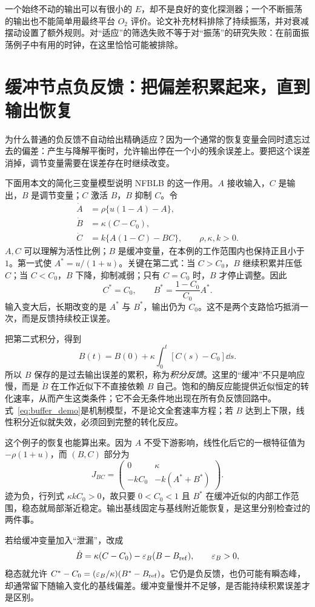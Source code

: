 一个始终不动的输出可以有很小的 $E$，却不是良好的变化探测器；一个不断振荡的输出也不能简单用最终平台 $O_2$ 评价。论文补充材料排除了持续振荡，并对衰减摆动设置了额外规则。对“适应”的筛选失败不等于对“振荡”的研究失败：在前面振荡例子中有用的时钟，在这里恰恰可能被排除。

\section{缓冲节点负反馈：把偏差积累起来，直到输出恢复}
为什么普通的负反馈不自动给出精确适应？因为一个通常的恢复变量会同时遗忘过去的偏差：产生与降解平衡时，允许输出停在一个小的残余误差上。要把这个误差消掉，调节变量需要在误差存在时继续改变。

下面用本文的简化三变量模型说明 NFBLB 的这一作用。$A$ 接收输入，$C$ 是输出，$B$ 是调节变量；$C$ 激活 $B$，$B$ 抑制 $C$。令
\begin{align}
\dot A&=\rho\{u(1-A)-A\},\\
\dot B&=\kappa(C-C_0),\\
\dot C&=k\{A(1-C)-BC\},\qquad \rho,\kappa,k>0.\label{eq:buffer_demo}
\end{align}
$A,C$ 可以理解为活性比例；$B$ 是缓冲变量，在本例的工作范围内也保持正且小于 $1$。第一式使 $A^*=u/(1+u)$。关键在第二式：当 $C>C_0$，$B$ 继续积累并压低 $C$；当 $C<C_0$，$B$ 下降，抑制减弱；只有 $C=C_0$ 时，$B$ 才停止调整。因此
\[
C^*=C_0,\qquad B^*=\frac{1-C_0}{C_0}A^*.
\]
输入变大后，长期改变的是 $A^*$ 与 $B^*$，输出仍为 $C_0$。这不是两个支路恰巧抵消一次，而是反馈持续校正误差。

把第二式积分，得到
\[
B(t)=B(0)+\kappa\int_0^t[C(s)-C_0]\dd s.
\]
所以 $B$ 保存的是过去输出误差的累积，称为\emph{积分反馈}。这里的“缓冲”不只是响应慢，而是 $\dot B$ 在工作近似下不直接依赖 $B$ 自己。饱和的酶反应能提供近似恒定的转化速率，从而产生这类条件；它不会无条件地出现在所有负反馈回路中。式~\eqref{eq:buffer_demo}是机制模型，不是论文全套速率方程；若 $B$ 达到上下限，线性积分近似就失效，必须回到完整的转化反应。

这个例子的恢复也能算出来。因为 $A$ 不受下游影响，线性化后它的一根特征值为 $-\rho(1+u)$，而 $(B,C)$ 部分为
\[
J_{BC}=\begin{pmatrix}0&\kappa\\-kC_0&-k(A^*+B^*)\end{pmatrix}.
\]
迹为负，行列式 $\kappa kC_0>0$，故只要 $0<C_0<1$ 且 $B^*$ 在缓冲近似的内部工作范围，稳态就局部渐近稳定。输出基线固定与基线附近能恢复，是这里分别检查过的两件事。

若给缓冲变量加入“泄漏”，改成
\[
\dot B=\kappa(C-C_0)-\varepsilon_B(B-B_{\rm ref}),\qquad\varepsilon_B>0,
\]
稳态就允许 $C^*-C_0=(\varepsilon_B/\kappa)(B^*-B_{\rm ref})$。它仍是负反馈，也仍可能有瞬态峰，却通常留下随输入变化的基线偏差。缓冲变量慢并不足够，是否能持续积累误差才是区别。

